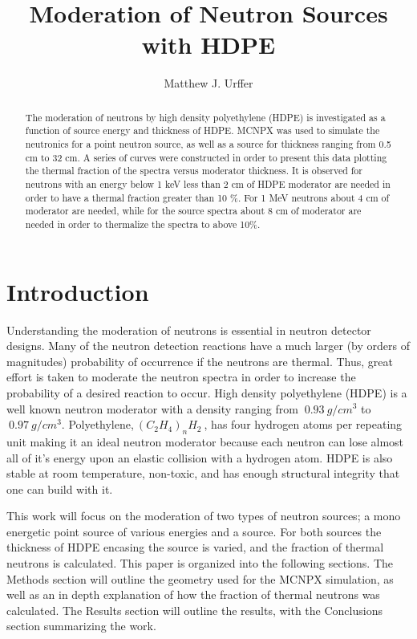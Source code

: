 \documentclass[final,onecolumn]{IEEEtran}
\begin{document}
\title{Moderation of Neutron Sources with HDPE}
\author{Matthew J. Urffer}

\maketitle
\begin{abstract}
The moderation of neutrons by high density polyethylene (HDPE) is investigated as a function of source energy and thickness of HDPE.
MCNPX was used to simulate the neutronics for a point neutron source, as well as a  source for thickness ranging from 0.5 cm to 32 cm.
A series of curves were constructed in order to present this data plotting the thermal fraction of the spectra versus moderator thickness.
It is observed for neutrons with an energy below 1 keV less than 2 cm of HDPE moderator are needed in order to have a thermal fraction greater than 10 \%.  
For 1 MeV neutrons about 4 cm of moderator are needed, while for the  source spectra about 8 cm of moderator are needed in order to thermalize the spectra to above 10\%.
\end{abstract}

\IEEEpeerreviewmaketitle

\pagebreak
\tableofcontents
\listoftodos
\listoffigures
\listoftables
\lstlistoflistings
\pagebreak

\section{Introduction}
Understanding the moderation of neutrons is essential in neutron detector designs.
Many of the neutron detection reactions have a much larger (by orders of magnitudes) probability of occurrence if the neutrons are thermal.
Thus, great effort is taken to moderate the neutron spectra in order to increase the probability of a desired reaction to occur.
High density polyethylene (HDPE) is a well known neutron moderator with a density ranging from $~0.93~g/cm^3$ to $~0.97~ g/cm^3$.
Polyethylene,$~\left (C_2 H_4\right )_n H_2~$, has four hydrogen atoms per repeating unit making it an ideal neutron moderator because each neutron can lose almost all of it's energy upon an elastic collision with a hydrogen atom.
HDPE is also stable at room temperature, non-toxic, and has enough structural integrity that one can build with it.

This work will focus on the moderation of two types of neutron sources; a mono energetic point source of various energies and a  source.
For both sources the thickness of HDPE encasing the source is varied, and the fraction of thermal neutrons is calculated.
This paper is organized into the following sections.  The Methods section will outline the geometry used for the MCNPX simulation, as well as an in depth explanation of how the fraction of thermal neutrons was calculated.  The Results section will outline the   results, with the Conclusions section summarizing the work.
\end{document}
